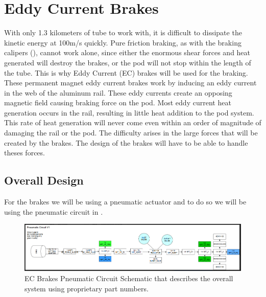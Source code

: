 \documentclass[main.tex]{subfiles}
\begin{document}
    \chapter{Eddy Current Brakes}
    \label{ch:eddy-current-brakes}
    With only 1.3 kilometers of tube to work with, it is difficult to dissipate the kinetic energy at 100m/s quickly. Pure friction braking, as with the braking calipers (), cannot work alone, since either the enormous shear forces and heat generated will destroy the brakes, or the pod will not stop within the length of the tube. This is why Eddy Current (EC) brakes will be used for the braking. These permanent magnet eddy current brakes work by inducing an eddy current in the web of the aluminum rail. These eddy currents create an opposing magnetic field causing braking force on the pod. Most eddy current heat generation occurs in the rail, resulting in little heat addition to the pod system. This rate of heat generation will never come even within an order of magnitude of damaging the rail or the pod. The difficulty arises in the large forces that will be created by the brakes. The design of the brakes will have to be able to handle theses forces. 

    \section{Overall Design}
    For the brakes we will be using a pneumatic actuator and to do so we will be using the pneumatic circuit in . \\
    \begin{figure}[H]
        \centering
        \includegraphics[width=\linewidth]{images/EC_Pnuematic_Circuit.png}
        \caption{EC Brakes Pneumatic Circuit Schematic that describes the overall system using proprietary part numbers.}
        \label{fig:pneumatic-circuit}
    \end{figure}
    
\end{document}
